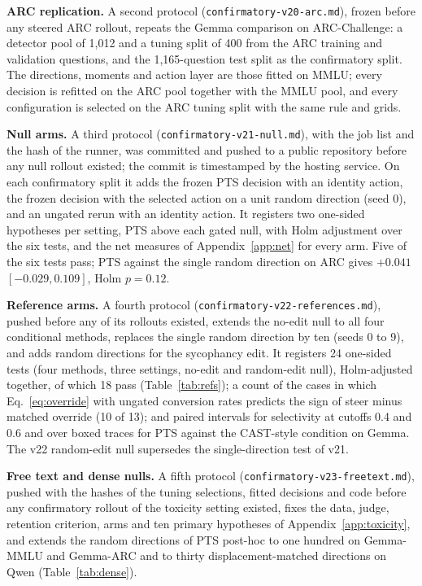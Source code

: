 \documentclass{article}
\begin{document}
\textbf{ARC replication.} A second protocol
(\texttt{confirmatory-v20-arc.md}), frozen before any steered ARC rollout,
repeats the Gemma comparison on ARC-Challenge: a detector pool of 1{,}012 and a
tuning split of 400 from the ARC training and validation questions, and the
1{,}165-question test split as the confirmatory split. The directions, moments
and action layer are those fitted on MMLU; every decision is refitted on the ARC
pool together with the MMLU pool, and every configuration is selected on the
ARC tuning split with the same rule and grids.

\textbf{Null arms.} A third protocol (\texttt{confirmatory-v21-null.md}), with
the job list and the hash of the runner, was committed and pushed to a public
repository before any null rollout existed; the commit is timestamped by the
hosting service. On each confirmatory split it adds the frozen PTS decision with
an identity action, the frozen decision with the selected action on a unit
random direction (seed 0), and an ungated rerun with an identity action. It
registers two one-sided hypotheses per setting, PTS above each gated null, with
Holm adjustment over the six tests, and the net measures of
Appendix~\ref{app:net} for every arm. Five of the six tests pass; PTS against
the single random direction on ARC gives $+0.041$ $[-0.029, 0.109]$, Holm
$p=0.12$.

\textbf{Reference arms.} A fourth protocol
(\texttt{confirmatory-v22-references.md}), pushed before any of its rollouts
existed, extends the no-edit null to all four conditional methods, replaces
the single random direction by ten (seeds 0 to 9), and adds random directions
for the sycophancy edit. It registers 24 one-sided tests (four methods, three
settings, no-edit and random-edit null), Holm-adjusted together, of which 18
pass (Table~\ref{tab:refs}); a count of the cases in which
Eq.~\eqref{eq:override} with ungated conversion rates predicts the sign of
steer minus matched override (10 of 13); and paired intervals for selectivity
at cutoffs 0.4 and 0.6 and over boxed traces for PTS against the CAST-style
condition on Gemma. The v22 random-edit null supersedes the single-direction
test of v21.

\textbf{Free text and dense nulls.} A fifth protocol
(\texttt{confirmatory-v23-freetext.md}), pushed with the hashes of the tuning
selections, fitted decisions and code before any confirmatory rollout of the
toxicity setting existed, fixes the data, judge, retention criterion, arms and
ten primary hypotheses of Appendix~\ref{app:toxicity}, and extends the random
directions of PTS post-hoc to one hundred on Gemma-MMLU and Gemma-ARC and to
thirty displacement-matched directions on Qwen (Table~\ref{tab:dense}).
\end{document}
